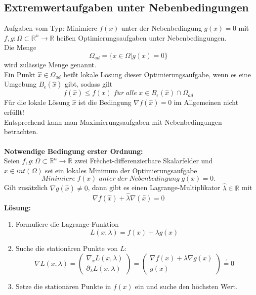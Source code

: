 \documentclass[a4paper,twocolumn,10pt]{article}
\newcommand{\sollsein}{\stackrel{!}{=}}
\begin{document}
\subsection{Extremwertaufgaben unter Nebenbedingungen}
Aufgaben vom Typ: Minimiere $f(x)$ unter der Nebenbedingung $g(x)=0$ mit $f,g:\Omega\subset\mathbb{R}^n\rightarrow\mathbb{R}$ heißen Optimierungsaufgaben unter Nebenbedingungen.\\
Die Menge
\begin{equation*}
\Omega_{ad}=\{x\in\Omega|g(x)=0\}
\end{equation*}
wird zulässige Menge genannt.\\
Ein Punkt $\hat{x}\in\Omega_{ad}$ heißt lokale Lösung dieser Optimierungsaufgabe, wenn es eine Umgebung $B_{\epsilon}(\hat{x})$ gibt, sodass gilt
\begin{equation*}
f(\hat{x})\leq f(x)\;f\ddot{u}r\;alle\;x\in B_{\epsilon}(\hat{x})\cap\Omega_{ad}
\end{equation*}
Für die lokale Lösung $\hat{x}$ ist die Bedingung $\nabla f(\hat{x})=0$ im Allgemeinen nicht erfüllt!\\
Entsprechend kann man Maximierungsaufgaben mit Nebenbedingungen betrachten.\\\\
\textbf{Notwendige Bedingung erster Ordnung:}\\
Seien $f,g:\Omega\subset\mathbb{R}^n\rightarrow\mathbb{R}$ zwei Frèchet-differenzierbare Skalarfelder und $\hat{x}\in int(\Omega)$ sei ein lokales Minimum der Optimierungsaufgabe
\begin{equation*}
Minimiere\;f(x)\;unter\;der\;Nebenbedingung\;g(x)=0.
\end{equation*}
Gilt zusätzlich $\nabla g(\hat{x})\neq 0$, dann gibt es einen Lagrange-Multiplikator $\hat{\lambda}\in\mathbb{R}$ mit
\begin{equation*}
\nabla f(\hat{x})+\hat{\lambda}\nabla(\hat{x})=0
\end{equation*}
\textbf{Lösung:}\\
\begin{enumerate}
\item Formuliere die Lagrange-Funktion
\begin{equation*}
L(x,\lambda)=f(x)+\lambda g(x)
\end{equation*}
\item Suche die stationären Punkte von $L$:
\begin{equation*}
\nabla L(x,\lambda)=\begin{pmatrix}\nabla_x L(x,\lambda) \\ \partial_{\lambda} L(x,\lambda)\end{pmatrix}=\begin{pmatrix}\nabla f(x)+\lambda\nabla g(x) \\ g(x)\end{pmatrix}\sollsein 0
\end{equation*}
\item Setze die stationären Punkte in $f(x)$ ein und suche den höchsten Wert.
\end{enumerate}
\end{document}
